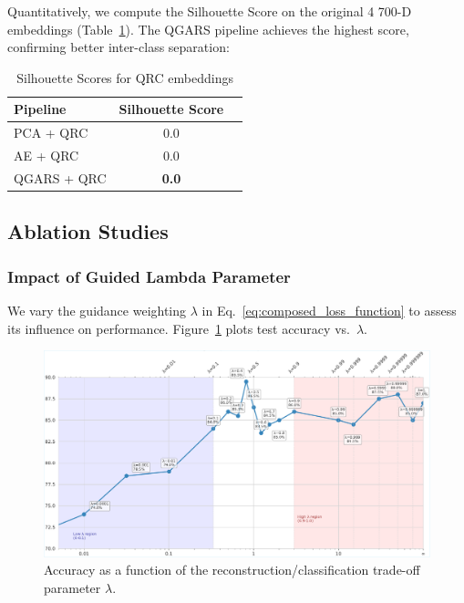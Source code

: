 \documentclass[conference]{IEEEtran}
\begin{document}
Quantitatively, we compute the Silhouette Score on the original 4 700-D embeddings (Table~\ref{tab:silhouette}). The QGARS pipeline achieves the highest score, confirming better inter-class separation:

\begin{table}[ht]
  \caption{Silhouette Scores for QRC embeddings}
  \label{tab:silhouette}
  \centering
  \begin{tabular}{lcc}
    \hline
    Pipeline         & Silhouette Score \\
    \hline
    PCA + QRC        & 0.0 \\
    AE + QRC         & 0.0 \\
    QGARS + QRC      & \textbf{0.0} \\
    \hline
  \end{tabular}
\end{table}


\subsection{Ablation Studies}

\subsubsection{Impact of Guided Lambda Parameter}
We vary the guidance weighting $\lambda$ in Eq.~\ref{eq:composed_loss_function} to assess its influence on performance. Figure~\ref{fig:lambda_sweep} plots test accuracy vs.\ $\lambda$.

\begin{figure}[ht]
  \centering
  \includegraphics[width=1\linewidth]{paper/images/results/generated_polyp_dataset/guided_lambda_log_mu_effect.pdf}
  \caption{Accuracy as a function of the reconstruction/classification trade-off parameter $\lambda$.}
  \label{fig:lambda_sweep}
\end{figure}
\end{document}
